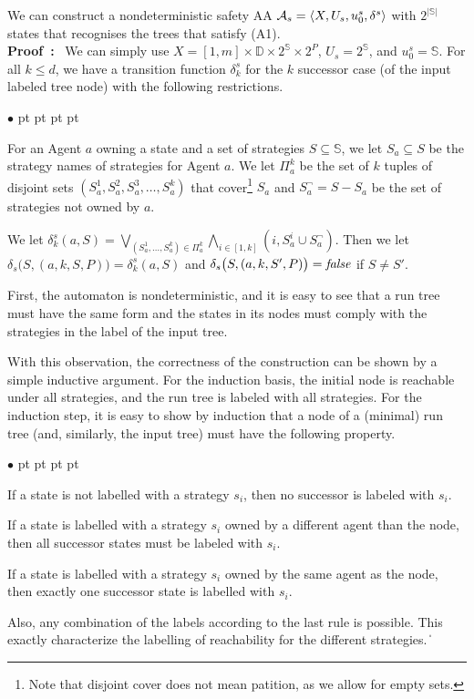 \documentclass[11pt]{article}
\newcommand{\cala}{{\cal A}}
\newcommand{\false}{\mbox{\em false}}
\newcommand{\pf}{\noindent\mbox{\bf Proof : }}
\newcommand{\bbbbd}{{\mathbb D}}
\newcommand{\bbbbs}{{\mathbb S}}
\def\qed{\ifmmode\|\else{\unskip\nobreak\hfil
\penalty50\hskip1em\null\nobreak\hfil$\blacksquare$
\parfillskip=0pt\finalhyphendemerits=0\endgraf}\fi}
\newenvironment{list1}{\begin{list}{$\bullet$}
{\topsep 0 pt \parsep 0 pt \partopsep 0 pt \itemsep 0 pt}}{\end{list}}
\begin{document}
{\lemma \label{lemma.A1} 
We can construct a nondeterministic safety AA 
$\cala_s=\langle X,U_s,u_0^s,\delta^s \rangle$ 
with $2^{|\bbbbs|}$ states that recognises 
the trees that satisfy (A1).
}
\\\pf 
We can simply use 
$X = [1,m] \times \bbbbd \times 2^\bbbbs \times 2^P$,
$U_s = 2^\bbbbs$, and 
$u_0^s = \bbbbs$.   
For all $k \leq d$, we have a transition function 
$\delta_k^s$ for the $k$ successor case (of the input labeled tree node) 
with the following restrictions. 
\begin{list1}
\item For an Agent $a$ owning a state and a set of strategies 
  $S \subseteq \bbbbs$, we let
  $S_a \subseteq S$ be the strategy names of strategies 
  for Agent $a$.  
  We let $\Pi^k_a$ be the set of $k$ tuples of disjoint sets $(S_a^1,S_a^2,S_a^3,\ldots, S_a^k)$ that cover\footnote{Note that disjoint cover does not mean patition, as we allow for empty sets.} $S_a$
  and $S^\neg_a = S - S_a$ be the set of strategies not owned by $a$.  
\item We let $\delta_k^s(a,S) = \bigvee_{(S_a^1,\ldots,S_a^k)\in \Pi_a^k}
  \bigwedge_{i\in [1,k]}(i,S_a^i\cup S^\neg_a)$.  
  Then we let $\delta_s \big(S,(a,k,S,P)\big) = \delta_k^s(a,S)$ 
  and \linebreak 
  $\delta_s \big(S,(a,k,S',P)\big)=\false$ if $S\neq S'$.
\end{list1}
First, the automaton is nondeterministic, and it is easy to see that a run tree must have the same form and the states in its nodes must comply with the strategies in the label of the input tree.

With this observation, the correctness of the construction can be shown by a simple inductive argument.
For the induction basis, the initial node is reachable under all strategies, and the run tree is labeled with all strategies.
For the induction step, it is easy to show by induction that a node of a (minimal) run tree (and, similarly, the input tree) must have the following property.
\begin{list1}
 \item If a state is not labelled with a strategy $s_i$, then no successor is labeled with $s_i$.
 \item If a state is labelled with a strategy $s_i$ owned by a different agent than the node, then all successor states must be labeled with $s_i$.
 \item If a state is labelled with a strategy $s_i$ owned by the same agent as the node, then exactly one successor state is labelled with $s_i$.
\end{list1}
Also, any combination of the labels according to the last rule is possible.
This exactly characterize the labelling of reachability for the different strategies.
\qed 
\end{document}

